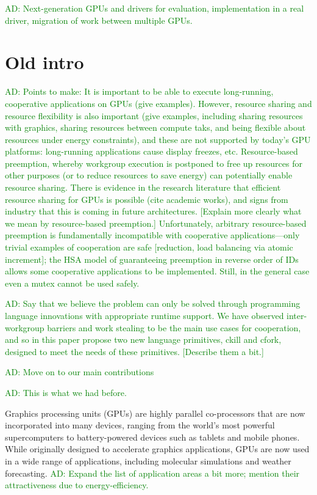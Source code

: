 \documentclass[nocopyrightspace]{sigplanconf-pldi16}
\newcommand{\ADComment}[1]{\textcolor{green}{AD: #1}}
\begin{document}
\ADComment{Next-generation GPUs and drivers for evaluation,
  implementation in a real driver, migration of work between multiple
  GPUs.}

\section{Old intro}


\ADComment{Points to make: It is important to be able to execute
  long-running, cooperative applications on GPUs (give examples).
  However, resource sharing and resource flexibility is also important
  (give examples, including sharing resources with graphics, sharing
  resources between compute taks, and being flexible about resources
  under energy constraints), and these are not supported by today's
  GPU platforms: long-running applications cause display freezes, etc.
  Resource-based preemption, whereby workgroup execution is postponed
  to free up resources for other purposes (or to reduce resources to
  save energy) can potentially enable resource sharing.  There is
  evidence in the research literature that efficient resource sharing
  for GPUs is possible (cite academic works), and signs from industry
  that this is coming in future architectures.  [Explain more clearly
    what we mean by resource-based preemption.]  Unfortunately,
  arbitrary resource-based preemption is fundamentally incompatible
  with cooperative applications---only trivial examples of cooperation
  are safe [reduction, load balancing via atomic increment]; the HSA
  model of guaranteeing preemption in reverse order of IDs allows some
  cooperative applications to be implemented.  Still, in the general
  case even a mutex cannot be used safely.}

\ADComment{Say that we believe the problem can only be solved through
  programming language innovations with appropriate runtime support.
  We have observed inter-workgroup barriers and work stealing to be
  the main use cases for cooperation, and so in this paper propose two
  new language primitives, ckill and cfork, designed to meet the needs
  of these primitives.  [Describe them a bit.]}

\ADComment{Move on to our main contributions}

\ADComment{This is what we had before.}

Graphics processing units (GPUs) are highly parallel co-processors that are now incorporated into many
devices, ranging from the world's most powerful supercomputers to battery-powered devices such as tablets and mobile phones. While
originally designed to accelerate graphics applications, GPUs are now
used in a wide range of applications, including molecular simulations
and weather forecasting. \ADComment{Expand the list of application areas a bit more; mention their attractiveness due to energy-efficiency.}
\end{document}
